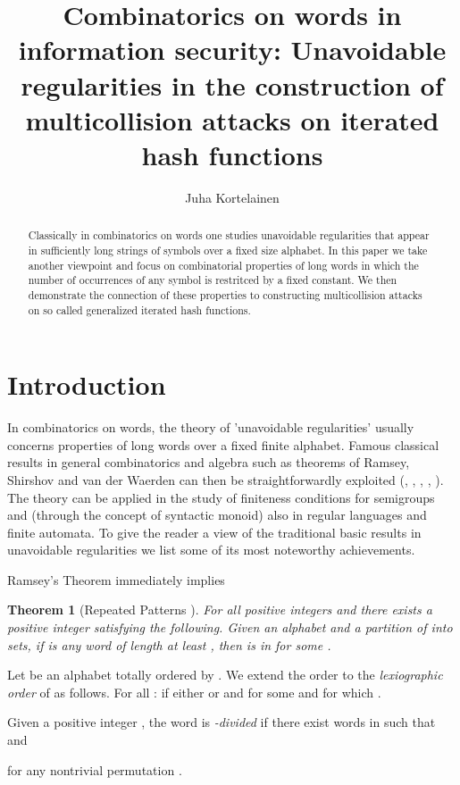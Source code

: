\documentclass[submission,copyright,creativecommons]{eptcs}
\title{Combinatorics on words in information security: Unavoidable regularities
 in the construction of multicollision attacks on iterated hash functions}
\author{Juha Kortelainen
\institute{Department of Information Processing Science, University of Oulu, Finland}
\email{jkortela@tols16.oulu.fi}}
\newtheorem{theorem}{Theorem}
\begin{document}
\maketitle

\begin{abstract}
Classically in combinatorics on words one studies unavoidable regularities that appear in sufficiently 
long strings of symbols over a fixed size alphabet. In this paper we take another viewpoint and focus on 
combinatorial properties of long words in which the number of occurrences of any symbol is restritced by 
a fixed constant. We then demonstrate the connection  of these properties to constructing multicollision
attacks on so called generalized iterated hash functions.
\end{abstract}


\section{Introduction}

In combinatorics on words, the theory of 'unavoidable regularities' usually concerns properties of long words over a fixed finite alphabet. Famous classical results in general combinatorics and algebra such as theorems of Ramsey, Shirshov and van der Waerden can then be straightforwardly exploited (\cite{Har}, \cite{dLV}, \cite{Res}, \cite{RR1}, \cite{RR2}). The theory can be applied in the study of finiteness conditions for semigroups and (through the concept of syntactic monoid) also in regular languages and finite automata. 
To give the reader a view of the traditional basic results in unavoidable regularities we list some of its most noteworthy achievements.

Ramsey's Theorem immediately implies 

\begin{theorem}[Repeated Patterns \cite{Har}] For all positive integers  and  there exists a positive integer  satisfying the following. Given an alphabet  and a partition  of  into  sets, if  is any word of length at least , then  is in  for some .
\end{theorem}

Let  be an alphabet totally ordered by . We extend the order  to the \textit{lexiographic order}  of  as follows. For all :  if either  or  and  for some  and  for which .

Given a positive integer , the word  is \textit{-divided} if there exist words  in  such that  and 

for any nontrivial permutation . 
\end{document}
